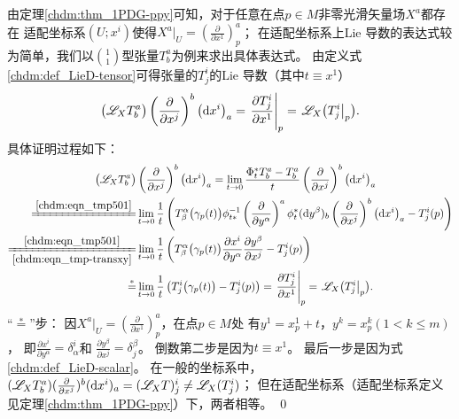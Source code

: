 由定理\ref{chdm:thm_1PDG-ppy}可知，对于任意在点$p\in M$非零光滑矢量场$X^a$都存在
{\kaishu 适配坐标系}$(U;x^i)$使得$X^a |_U = (\frac{\partial }{\partial x^1} )^a_p$；
在适配坐标系上Lie 导数的表达式较为简单，我们以$\binom{1}{1}$型张量$T_b^a$为例来求出具体表达式。
由定义式\eqref{chdm:def_LieD-tensor}可得张量的$T_{j}^{i}$的Lie 导数（其中$t\equiv x^1$）
\begin{equation}\label{chdm:eqn_LieD-adaptedX}
    \bigl( \mathscr{L}_{X} T_{b}^{a} \bigr)
    \left(\frac{\partial }{\partial x^{j}}\right)^{b} \left({\rm d}x^i \right)_a
    = \left. \frac{\partial T_{j}^{i}}{\partial x^1 } \right|_{p} 
    =\left. \mathscr{L}_{X} \bigl(T_{j}^{i} \right|_{p} \bigr) .
\end{equation}
具体证明过程如下：
\begin{align*}
    \bigl( \Lie_{X} T_{b}^{a} \bigr)&
    \left(\frac{\partial }{\partial x^{j}}\right)^{b} \left({\rm d}x^i \right)_a
    = \lim_{t\to 0} \frac{\Phi^{*}_{t} T_{b}^{a}-T_{b}^{a}}{t}  
    \left(\frac{\partial }{\partial x^{j}}\right)^{b} \left({\rm d}x^i \right)_a \\
     \xlongequal{\ref{chdm:eqn_tmp501}}&  \lim_{t\to 0} \frac{1}{t}\left( 
        T^{\alpha}_{\beta}\bigl(\gamma_p(t)\bigr) \phi_{t*} ^{-1} 
         \left(\frac{\partial }{\partial y^{\alpha}}\right)^{a}
          \phi_{t}^{*}({\rm d}y^{\beta})_{b}  
          \left(\frac{\partial }{\partial x^{j}}\right)^{b} \left({\rm d}x^i \right)_a
           -T_{j}^{i}(p) \right) \\
    \xlongequal[\ref{chdm:eqn_tmp-transxy}]{\ref{chdm:eqn_tmp501}}&
    \lim_{t\to 0} \frac{1}{t}\left( T^{\alpha}_{\beta}\bigl(\gamma_p(t)\bigr) 
    \frac{\partial x^i}{\partial y^{\alpha}} \frac{\partial y^\beta}{\partial x^{j}}
    -T_{j}^{i}(p) \right) \\
    \overset{*}{=}&  \lim_{t\to 0} \frac{1}{t}\left( T_{j}^{i}\bigl(\gamma_p(t)\bigr)   -T_{j}^{i}(p) \right) 
    = \left. \frac{\partial T_{j}^{i}}{\partial x^1 } \right|_{p} 
    =\left. \Lie_{X} \bigl(T_{j}^{i} \right|_{p} \bigr) .
\end{align*}
“$\overset{*}{=}$”步：
因$X^a |_U = (\frac{\partial }{\partial x^1} )^a_p$，在点$p\in M$处
有$y^1=x^1_p+t$，$y^k =x^k_p (1< k \leqslant m)$，
即$\frac{\partial x^i}{\partial y^{\alpha}}=\delta^i_\alpha$和
$\frac{\partial y^\beta}{\partial x^{j}}=\delta^\beta_j$。
倒数第二步是因为$t\equiv x^1$。
最后一步是因为式\eqref{chdm:def_LieD-scalar}。
在一般的坐标系中，$( \mathscr{L}_{X} T_{b}^{a} )
(\frac{\partial }{\partial x^{j}})^{b} ({\rm d}x^i )_a 
= ( \mathscr{L}_{X} T ) _{j}^{i} \neq  \mathscr{L}_{X} (T  _{j}^{i})$；
但在适配坐标系（适配坐标系定义见定理\ref{chdm:thm_1PDG-ppy}）下，两者相等。
\qed


